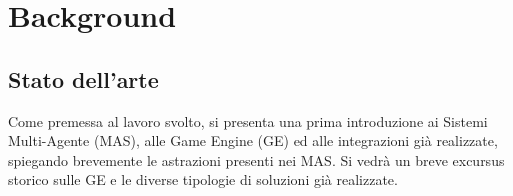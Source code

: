 \chapter{Background}

\section{Stato dell'arte}

Come premessa al lavoro svolto, si presenta una prima introduzione ai Sistemi Multi-Agente (MAS), alle Game Engine (GE) ed alle integrazioni già realizzate, spiegando brevemente le astrazioni presenti nei MAS. Si vedrà un breve excursus storico sulle GE e le diverse tipologie di soluzioni già realizzate.










